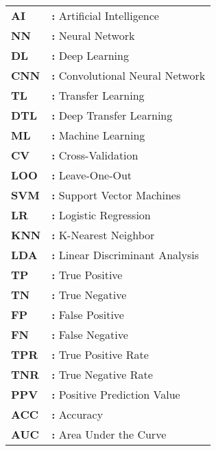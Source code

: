 \hspace{-3mm}
\begin{tabular}{p{2cm}l}
{\bf{AI}} & {\bf:} Artificial Intelligence\\
{\bf{NN}} & {\bf:} Neural Network\\
{\bf{DL}} & {\bf:} Deep Learning\\
{\bf CNN} & {\bf:} Convolutional Neural Network\\
{\bf TL} & {\bf:} Transfer Learning\\
{\bf DTL} & {\bf:} Deep Transfer Learning\\
{\bf ML} & {\bf:} Machine Learning\\
{\bf CV} & {\bf:} Cross-Validation\\
{\bf LOO} & {\bf:} Leave-One-Out\\
{\bf SVM} & {\bf:} Support Vector Machines\\
{\bf LR} & {\bf:} Logistic Regression\\
{\bf KNN} & {\bf:} K-Nearest Neighbor\\
{\bf LDA} & {\bf:} Linear Discriminant Analysis\\
{\bf TP} & {\bf:} True Positive\\
{\bf TN} & {\bf:} True Negative\\
{\bf FP} & {\bf:} False Positive\\
{\bf FN} & {\bf:} False Negative\\
{\bf TPR} & {\bf:} True Positive Rate\\
{\bf TNR} & {\bf:} True Negative Rate\\
{\bf PPV} & {\bf:} Positive Prediction Value\\
{\bf ACC} & {\bf:} Accuracy\\
{\bf AUC} & {\bf:} Area Under the Curve\\
\end{tabular}

